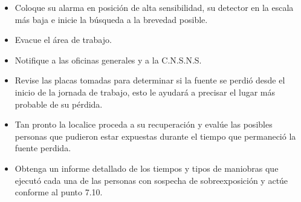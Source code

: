\begin{itemize}
\item Coloque su alarma en posición de alta sensibilidad, su detector en la escala más baja e inicie la búsqueda a la brevedad posible.

\item Evacue el área de trabajo.

\item Notifique a las oficinas generales y a la C.N.S.N.S.

\item Revise las placas tomadas para determinar si la fuente se perdió desde el inicio de la jornada de trabajo, esto le ayudará a precisar el lugar más probable de su pérdida.

\item Tan pronto la localice proceda a su recuperación y evalúe las posibles personas que pudieron estar expuestas durante el tiempo que permaneció la fuente perdida.

\item Obtenga un informe detallado de los tiempos y tipos de maniobras que ejecutó cada una de las personas con sospecha de sobreexposición y actúe conforme al punto 7.10.
\end{itemize}
